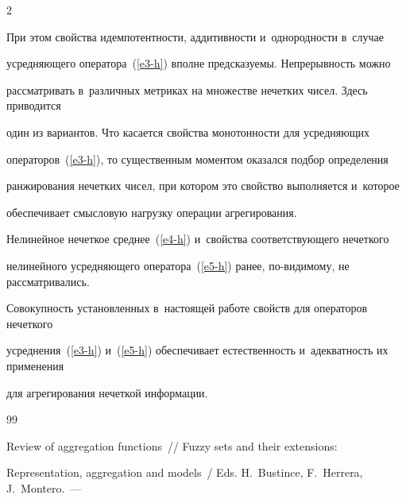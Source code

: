 \begin{multicols}{2}
%


При этом свойства идемпотентности, аддитивности  и~однородности в~случае 


усредняющего оператора~(\ref{e3-h}) вполне предсказуемы. Непрерывность можно 


рассматривать в~различных метриках на множестве нечетких чисел. Здесь приводится 


один из вариантов.  Что касается свойства монотонности для усредняющих 


операторов~(\ref{e3-h}), то существенным моментом оказался подбор определения 


ранжирования нечетких чисел, при котором это свойство выполняется и~которое 


обеспечивает смысловую нагрузку операции агрегирования.





Нелинейное нечеткое среднее~(\ref{e4-h}) и~свойства соответствующего нечеткого 


нелинейного усред\-ня\-юще\-го оператора~(\ref{e5-h}) ранее, по-ви\-ди\-мо\-му, не рас\-смат\-ри\-ва\-лись.





Совокупность установленных в~настоящей работе свойств для операторов нечеткого 


усреднения~(\ref{e3-h}) и~(\ref{e5-h}) обеспечивает естественность и~адекватность их применения 


для агрегирования нечеткой информации.





\vspace*{-6pt}





{\small\frenchspacing


 {%




 \begin{thebibliography}{99}






Review of aggregation functions~// Fuzzy sets and their extensions: 


Representation, aggregation and models~/ Eds. H.~Bustince, F.~Herrera, J.~Montero.~--- 



\end{thebibliography}}}
\end{multicols}
